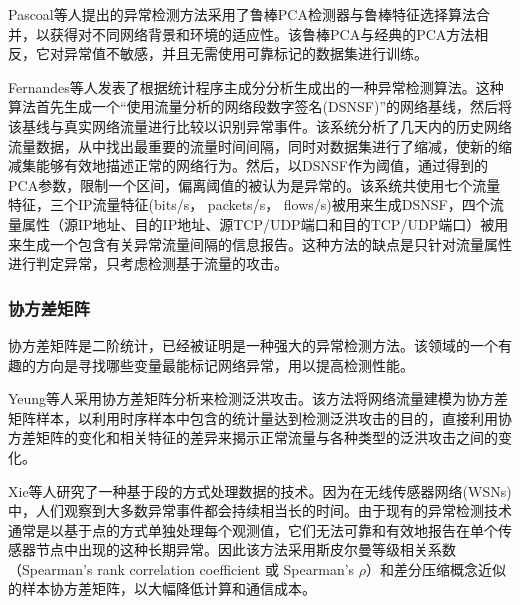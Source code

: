 Pascoal等人\cite{pascoal2012robust}提出的异常检测方法采用了鲁棒PCA检测器与鲁棒特征选择算法合并，以获得对不同网络背景和环境的适应性。该鲁棒PCA与经典的PCA方法相反，它对异常值不敏感，并且无需使用可靠标记的数据集进行训练。

Fernandes等人\cite{fernandes2016network}发表了根据统计程序主成分分析生成出的一种异常检测算法。这种算法首先生成一个“使用流量分析的网络段数字签名(DSNSF)”的网络基线，然后将该基线与真实网络流量进行比较以识别异常事件。该系统分析了几天内的历史网络流量数据，从中找出最重要的流量时间间隔，同时对数据集进行了缩减，使新的缩减集能够有效地描述正常的网络行为。然后，以DSNSF作为阈值，通过得到的PCA参数，限制一个区间，偏离阈值的被认为是异常的。该系统共使用七个流量特征，三个IP流量特征(bits/s， packets/s， flows/s)被用来生成DSNSF，四个流量属性（源IP地址、目的IP地址、源TCP/UDP端口和目的TCP/UDP端口）被用来生成一个包含有关异常流量间隔的信息报告。这种方法的缺点是只针对流量属性进行判定异常，只考虑检测基于流量的攻击。


\subsubsection{协方差矩阵}

协方差矩阵是二阶统计，已经被证明是一种强大的异常检测方法。该领域的一个有趣的方向是寻找哪些变量最能标记网络异常，用以提高检测性能。

Yeung等人\cite{yeung2007covariance}采用协方差矩阵分析来检测泛洪攻击。该方法将网络流量建模为协方差矩阵样本，以利用时序样本中包含的统计量达到检测泛洪攻击的目的，直接利用协方差矩阵的变化和相关特征的差异来揭示正常流量与各种类型的泛洪攻击之间的变化。


 Xie等人\cite{xie2014segment}研究了一种基于段的方式处理数据的技术。因为在无线传感器网络(WSNs)中，人们观察到大多数异常事件都会持续相当长的时间。由于现有的异常检测技术通常是以基于点的方式单独处理每个观测值，它们无法可靠和有效地报告在单个传感器节点中出现的这种长期异常。因此该方法采用斯皮尔曼等级相关系数（Spearman's rank correlation coefficient 或 Spearman's $\rho$）和差分压缩概念近似的样本协方差矩阵，以大幅降低计算和通信成本。








